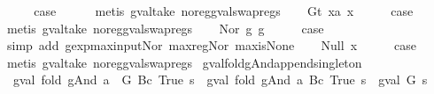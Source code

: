 \begin{isabellebody}
\ \ \isamarkupfalse%
\ \isamarkupfalse%
\ {\isacharquery}case\isanewline
\ \ \ \ \isamarkupfalse%
\ {\isacharparenleft}metis\ gval{\isacharunderscore}take\ no{\isacharunderscore}reg{\isacharunderscore}gval{\isacharunderscore}swap{\isacharunderscore}regs{\isacharparenright}\isanewline
{}\isamarkupfalse%
\isanewline
\ \ \isamarkupfalse%
\ {\isacharparenleft}Gt\ x{}a\ x{}{\isacharparenright}\isanewline
\ \ \isamarkupfalse%
\ \isamarkupfalse%
\ {\isacharquery}case\isanewline
\ \ \ \ \isamarkupfalse%
\ {\isacharparenleft}metis\ gval{\isacharunderscore}take\ no{\isacharunderscore}reg{\isacharunderscore}gval{\isacharunderscore}swap{\isacharunderscore}regs{\isacharparenright}\isanewline
{}\isamarkupfalse%
\isanewline
\ \ \isamarkupfalse%
\ {\isacharparenleft}Nor\ g{}\ g{}{\isacharparenright}\isanewline
\ \ \isamarkupfalse%
\ \isamarkupfalse%
\ {\isacharquery}case\isanewline
\ \ \ \ \isamarkupfalse%
\ {\isacharparenleft}simp\ add{\isacharcolon}\ gexp{\isacharunderscore}max{\isacharunderscore}input{\isacharunderscore}Nor\ max{\isacharunderscore}reg{\isacharunderscore}Nor\ max{\isacharunderscore}is{\isacharunderscore}None{\isacharparenright}\isanewline
{}\isamarkupfalse%
\isanewline
\ \ \isamarkupfalse%
\ {\isacharparenleft}Null\ x{\isacharparenright}\isanewline
\ \ \isamarkupfalse%
\ \isamarkupfalse%
\ {\isacharquery}case\isanewline
\ \ \ \ \isamarkupfalse%
\ {\isacharparenleft}metis\ gval{\isacharunderscore}take\ no{\isacharunderscore}reg{\isacharunderscore}gval{\isacharunderscore}swap{\isacharunderscore}regs{\isacharparenright}\isanewline
{}\isamarkupfalse%
%
\endisatagproof
{\isafoldproof}%
%
\isadelimproof
\isanewline
%
\endisadelimproof
\isanewline
{}\isamarkupfalse%
\ gval{\isacharunderscore}fold{\isacharunderscore}gAnd{\isacharunderscore}append{\isacharunderscore}singleton{\isacharcolon}\isanewline
\ \ {\isachardoublequoteopen}gval\ {\isacharparenleft}fold\ gAnd\ {\isacharparenleft}a\ {\isacharat}\ {\isacharbrackleft}G{\isacharbrackright}{\isacharparenright}\ {\isacharparenleft}Bc\ True{\isacharparenright}{\isacharparenright}\ s\ {\isacharequal}\ gval\ {\isacharparenleft}fold\ gAnd\ a\ {\isacharparenleft}Bc\ True{\isacharparenright}{\isacharparenright}\ s\ {\isasymand}\isactrlsub {\isacharquery}\ gval\ G\ s{\isachardoublequoteclose}\isanewline

\end{isabellebody}
